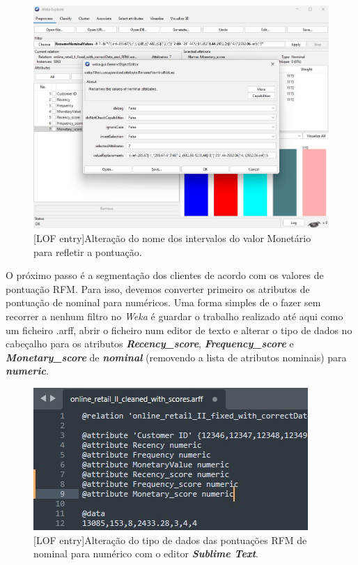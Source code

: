 \documentclass{easychair}
\begin{document}
\begin{figure}[H]
    \begin{centering}
    \includegraphics[width=0.85\linewidth]{imagens/figure11.jpg}\label{cap-4-fig11}
    [LOF entry]{Alteração do nome dos intervalos do valor Monetário para refletir a pontuação.}
    \label{fig11}
    \end{centering}
\end{figure}

O próximo passo é a segmentação dos clientes de acordo com os valores de pontuação RFM. Para isso, devemos converter primeiro os atributos de pontuação de nominal para numéricos. Uma forma simples de o fazer sem recorrer a nenhum filtro no \textit{Weka} é guardar o trabalho realizado até aqui como um ficheiro .arff, abrir o ficheiro num editor de texto e alterar o tipo de dados no cabeçalho para os atributos \textit{\textbf{Recency_score}}, \textit{\textbf{Frequency_score}} e \textit{\textbf{Monetary_score}} de \textit{\textbf{nominal}} (removendo a lista de atributos nominais) para \textit{\textbf{numeric}}.

\begin{figure}[H]
    \begin{centering}
    \includegraphics[width=0.8\linewidth]{imagens/figure15.jpg}\label{cap-4-fig15}
    [LOF entry]{Alteração do tipo de dados das pontuações RFM de nominal para numérico com o editor \textit{\textbf{Sublime Text}}.}
    \label{fig15}
    \end{centering}
\end{figure}
\end{document}
